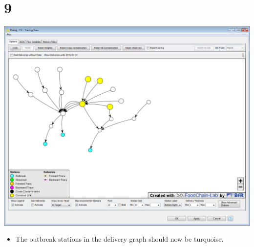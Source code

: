 \documentclass[10pt]{beamer}
\begin{document}
\section{9}
\begin{frame}
	\begin{center}
  		\includegraphics[height=0.6\textheight]{9.png}
	\end{center}
	\begin{itemize}
		\item The outbreak stations in the delivery graph should now be turquoise.
	\end{itemize}
\end{frame}
\end{document}
